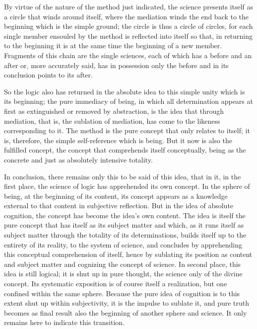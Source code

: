 By virtue of the nature of the method just indicated,
the science presents itself as a circle that winds around itself,
where the mediation winds the end back to the beginning
which is the simple ground;
the circle is thus a circle of circles,
for each single member ensouled by the method
is reflected into itself so that, in returning to the beginning
it is at the same time the beginning of a new member.
Fragments of this chain are the single sciences,
each of which has a before and an after
or, more accurately said,
has in possession only the before
and in its conclusion points to its after.

So the logic also has returned in the absolute idea
to this simple unity which is its beginning;
the pure immediacy of being,
in which all determination appears at first
as extinguished or removed by abstraction,
is the idea that through mediation,
that is, the sublation of mediation,
has come to the likeness corresponding to it.
The method is the pure concept
that only relates to itself;
it is, therefore, the simple self-reference which is being.
But it now is also the fulfilled concept,
the concept that comprehends itself conceptually,
being as the concrete and just as absolutely intensive totality.

In conclusion, there remains only this to be said of this idea,
that in it, in the first place,
the science of logic has apprehended its own concept.
In the sphere of being, at the beginning of its content,
its concept appears as a knowledge external to
that content in subjective reflection.
But in the idea of absolute cognition,
the concept has become the idea's own content.
The idea is itself the pure concept
that has itself as its subject matter
and which, as it runs itself as subject matter
through the totality of its determinations,
builds itself up to the entirety of its reality,
to the system of science,
and concludes by apprehending this
conceptual comprehension of itself,
hence by sublating its position
as content and subject matter
and cognizing the concept of science.
In second place, this idea is still logical;
it is shut up in pure thought,
the science only of the divine concept.
Its systematic exposition is of course itself a realization,
but one confined within the same sphere.
Because the pure idea of cognition is
to this extent shut up within subjectivity,
it is the impulse to sublate it,
and pure truth becomes as final result
also the beginning of another sphere and science.
It only remains here to indicate this transition.

